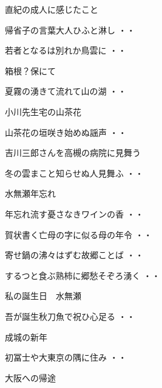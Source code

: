 \vspace{0.6cm}
直紀の成人に感じたこと
\begin{shiika}帰省子の言葉大人ひふと淋し
\hfill{・・}\end{shiika}
\begin{shiika}若者となるは別れか鳥雲に
\hfill{・・}\end{shiika}
\vspace{0.6cm}
箱根？保にて
\begin{shiika}夏霧の湧きて流れて山の湖
\hfill{・・}\end{shiika}
\vspace{0.6cm}
小川先生宅の山茶花
\begin{shiika}山茶花の垣咲き始めぬ謡声
\hfill{・・}\end{shiika}
\vspace{0.6cm}
吉川三郎さんを高槻の病院に見舞う
\begin{shiika}冬の雲まこと知らせぬ人見舞ふ
\hfill{・・}\end{shiika}
\vspace{0.6cm}
水無瀬年忘れ
\begin{shiika}年忘れ流す憂さなきワインの香
\hfill{・・}\end{shiika}
\begin{shiika}賀状書く亡母の字に似る母の年令
\hfill{・・}\end{shiika}
\begin{shiika}寄せ鍋の沸々はずむ故郷ことば
\hfill{・・}\end{shiika}
\begin{shiika}するつと食ぶ熟柿に郷愁そぞろ湧く
\hfill{・・}\end{shiika}
\vspace{0.6cm}
私の誕生日　水無瀬
\begin{shiika}吾が誕生秋刀魚で祝ひ心足る
\hfill{・・}\end{shiika}
\vspace{0.6cm}
成城の新年
\begin{shiika}初冨士や大東京の隅に住み
\hfill{・・}\end{shiika}
\vspace{0.6cm}
大阪への帰途
